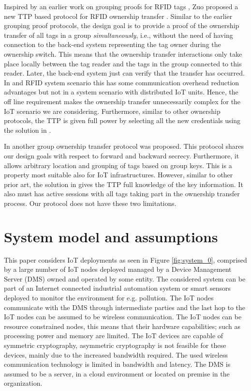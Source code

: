 {Inspired by an earlier work on grouping proofs for RFID tags \cite{Burmeister2008}, Zuo proposed a new TTP based protocol for RFID ownership transfer \cite{zuo2010changing}. Similar to the earlier grouping proof protocols, the design goal is to provide a proof of the ownership transfer of all tags in a group {\em simultaneously}, i.e., without the need of having connection to the back-end system representing the tag owner during the ownership switch. This means that the ownership transfer interactions only take place locally between the tag reader and the tags in the group connected to this reader. Later, the back-end system just can verify that the transfer has occurred. In and RFID system scenario this has some communication overhead reduction advantages but not in a system scenario with distributed IoT units.  Hence, the off line requirement makes the ownership transfer unnecessarily complex for the IoT scenario we are considering. Furthermore, similar to other ownership protocols, the TTP is given full power by selecting all the new credentials using the solution in \cite{zuo2010changing}. 

In \cite{He2014} another group ownership transfer protocol was proposed. This protocol shares our design goals with respect to forward and backward secrecy. Furthermore, it allows arbitrary location and grouping of tags based on group keys. This is a property most suitable also for IoT infrastructures. However, similar to other prior art, the solution in \cite{He2014} gives the TTP full knowledge of the key information. It also must has active sessions with all tags taking part in the ownership transfer process. Our protocol does not have these two limitations.

\section{System model and assumptions}
\label{sec:ot:System}

This paper considers IoT deployments as seen in Figure \ref{fig:system_0}, comprised by a large number of IoT nodes deployed  managed by a Device Management Server (DMS) owned and operated by some entity. The considered system can be part of an Internet connected industrial automation system or smart sensors deployed to monitor the environment for e.g. pollution. The IoT nodes communicate with the DMS through intermediate parties and the last hop to the IoT nodes can be assumed to be wireless communication. The IoT nodes can be resource constrained nodes, this means that their hardware capabilities; such as processing power and memory are limited. The IoT devices are capable of symmetric cryptography, asymmetric cryptography is not feasible for these devices, mainly due to the increased bandwidth required. The used wireless communication technology is limited in bandwidth and latency. The DMS is assumed to be a server, in a cloud environment or located on premise in the organization. 

}
